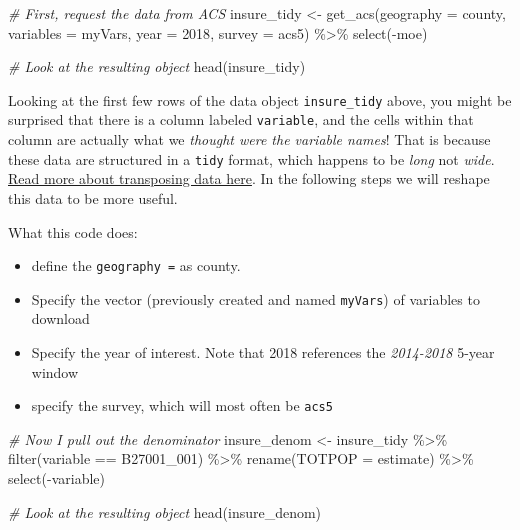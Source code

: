 \documentclass[
]{book}
\newenvironment{Shaded}{\begin{snugshade}}{\end{snugshade}}
\newcommand{\AttributeTok}[1]{\textcolor[rgb]{0.77,0.63,0.00}{#1}}
\newcommand{\CommentTok}[1]{\textcolor[rgb]{0.56,0.35,0.01}{\textit{#1}}}
\newcommand{\DecValTok}[1]{\textcolor[rgb]{0.00,0.00,0.81}{#1}}
\newcommand{\FunctionTok}[1]{\textcolor[rgb]{0.00,0.00,0.00}{#1}}
\newcommand{\NormalTok}[1]{#1}
\newcommand{\OtherTok}[1]{\textcolor[rgb]{0.56,0.35,0.01}{#1}}
\newcommand{\SpecialCharTok}[1]{\textcolor[rgb]{0.00,0.00,0.00}{#1}}
\newcommand{\StringTok}[1]{\textcolor[rgb]{0.31,0.60,0.02}{#1}}
\providecommand{\tightlist}{%
  \setlength{\itemsep}{0pt}\setlength{\parskip}{0pt}}
\newenvironment{rmdcaution}[1]
  {
  \begin{itemize}
  \renewcommand{\labelitemi}{
    \raisebox{-.7\height}[0pt][0pt]{
      {\setkeys{Gin}{width=3em,keepaspectratio}\texttt{[image: images/\#1]}}
    }
  }
  \setlength{\fboxsep}{1em}
  \begin{caution}
  \item
  }
  {
  \end{caution}
  \end{itemize}
  }
\begin{document}
\begin{Shaded}
\begin{Highlighting}[]
\CommentTok{\# First, request the data from ACS}
\NormalTok{insure\_tidy }\OtherTok{\textless{}{-}} \FunctionTok{get\_acs}\NormalTok{(}\AttributeTok{geography =} \StringTok{\textquotesingle{}county\textquotesingle{}}\NormalTok{,}
                     \AttributeTok{variables =}\NormalTok{ myVars,}
                     \AttributeTok{year =} \DecValTok{2018}\NormalTok{, }
                     \AttributeTok{survey =} \StringTok{\textquotesingle{}acs5\textquotesingle{}}\NormalTok{) }\SpecialCharTok{\%\textgreater{}\%}
  \FunctionTok{select}\NormalTok{(}\SpecialCharTok{{-}}\NormalTok{moe)}

\CommentTok{\# Look at the resulting object}
\FunctionTok{head}\NormalTok{(insure\_tidy)}
\end{Highlighting}
\end{Shaded}

\begin{rmdcaution}{caution}
Looking at the first few rows of the data object \texttt{insure\_tidy} above, you might be surprised that there is a column labeled \texttt{variable}, and the cells within that column are actually what we \emph{thought were the variable names}! That is because these data are structured in a \texttt{tidy} format, which happens to be \emph{long} not \emph{wide}. \protect\hyperlink{pivot_}{Read more about transposing data here}. In the following steps we will reshape this data to be more useful.

\end{rmdcaution}

What this code does:

\begin{itemize}
\tightlist
\item
  define the \texttt{geography\ =} as county.
\item
  Specify the vector (previously created and named \texttt{myVars}) of variables to download
\item
  Specify the year of interest. Note that 2018 references the \emph{2014-2018} 5-year window
\item
  specify the survey, which will most often be \texttt{acs5}
\end{itemize}

\begin{Shaded}
\begin{Highlighting}[]
\CommentTok{\# Now I pull out the denominator}
\NormalTok{insure\_denom }\OtherTok{\textless{}{-}}\NormalTok{ insure\_tidy }\SpecialCharTok{\%\textgreater{}\%}
  \FunctionTok{filter}\NormalTok{(variable }\SpecialCharTok{==} \StringTok{\textquotesingle{}B27001\_001\textquotesingle{}}\NormalTok{) }\SpecialCharTok{\%\textgreater{}\%}
  \FunctionTok{rename}\NormalTok{(}\AttributeTok{TOTPOP =}\NormalTok{ estimate) }\SpecialCharTok{\%\textgreater{}\%}
  \FunctionTok{select}\NormalTok{(}\SpecialCharTok{{-}}\NormalTok{variable)}

\CommentTok{\# Look at the resulting object}
\FunctionTok{head}\NormalTok{(insure\_denom)}
\end{Highlighting}
\end{Shaded}
\end{document}
